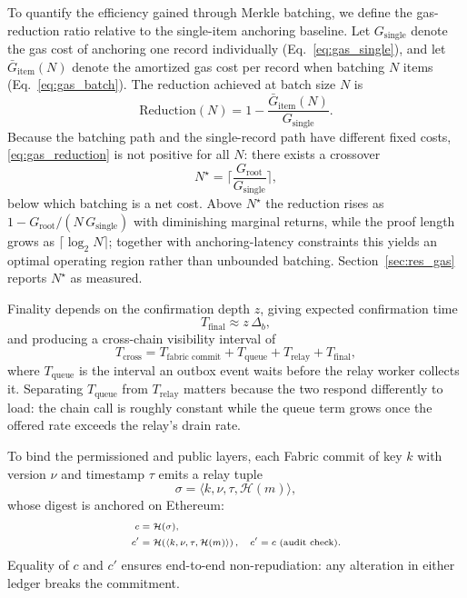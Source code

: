 \documentclass[final,5p,times,twocolumn]{elsarticle}
\begin{document}
To quantify the efficiency gained through Merkle batching, we define the gas-reduction ratio relative to the single-item anchoring baseline. Let $G_{\text{single}}$ denote the gas cost of anchoring one record individually (Eq.~\ref{eq:gas_single}), and let $\bar{G}_{\text{item}}(N)$ denote the amortized gas cost per record when batching $N$ items (Eq.~\ref{eq:gas_batch}). The reduction achieved at batch size $N$ is
\begin{equation}
\mathrm{Reduction}(N)
=
1 - \frac{\bar{G}_{\text{item}}(N)}{G_{\text{single}}}.
\label{eq:gas_reduction}
\end{equation}
Because the batching path and the single-record path have different fixed costs, \eqref{eq:gas_reduction} is not positive for all $N$: there exists a crossover
\begin{equation}
  N^\star = \Big\lceil \frac{G_{\text{root}}}{G_{\text{single}}} \Big\rceil,
  \label{eq:gas_crossover}
\end{equation}
below which batching is a net cost. Above $N^\star$ the reduction rises as $1-G_{\text{root}}/(N\,G_{\text{single}})$ with diminishing marginal returns, while the proof length grows as $\lceil\log_2 N\rceil$; together with anchoring-latency constraints this yields an optimal operating region rather than unbounded batching. Section~\ref{sec:res_gas} reports $N^\star$ as measured.

Finality depends on the confirmation depth $z$, giving expected confirmation time
\begin{equation}
T_{\text{final}} \approx z\,\Delta_b,
\label{eq:finality}
\end{equation}
and producing a cross-chain visibility interval of
\begin{equation}
T_{\text{cross}}
=
T_{\text{fabric commit}}
+ T_{\text{queue}}
+ T_{\text{relay}}
+ T_{\text{final}},
\label{eq:cross_sla}
\end{equation}
where $T_{\text{queue}}$ is the interval an outbox event waits before the relay worker collects it. Separating $T_{\text{queue}}$ from $T_{\text{relay}}$ matters because the two respond differently to load: the chain call is roughly constant while the queue term grows once the offered rate exceeds the relay's drain rate.

To bind the permissioned and public layers, each Fabric commit of key $k$ with version $\nu$ and timestamp $\tau$ emits a relay tuple
\[
\sigma = \langle k,\nu,\tau,\mathcal{H}(m)\rangle,
\]
whose digest is anchored on Ethereum:
\begin{subequations}
\scriptsize
\begin{align}
c &= \mathcal{H}(\sigma), \label{eq:anchor_c}\\
c' &= \mathcal{H}\!\left(\langle k,\nu,\tau,\mathcal{H}(m)\rangle\right),\quad c'=c \ \text{(audit check)}. \label{eq:anchor_eq}
\end{align}
\end{subequations}
Equality of $c$ and $c'$ ensures end-to-end non-repudiation: any alteration in either ledger breaks the commitment.
\end{document}
